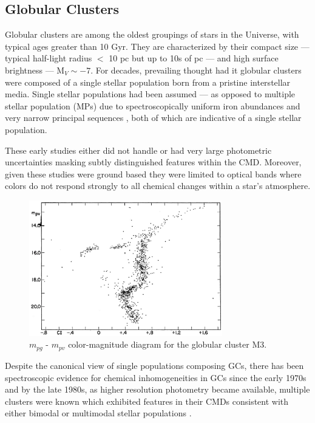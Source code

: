 \subsection{Globular Clusters}
Globular clusters \citep[GC,][]{Herschel1814} are among the oldest groupings of
stars in the Universe, with typical ages greater than 10 Gyr. They are
characterized by their compact size --- typical half-light radius $<$ 10 pc but
up to 10s of pc --- and high surface brightness --- M$_{V} \sim -7$. For
decades, prevailing thought had it globular clusters were composed of a single
stellar population born from a pristine interstellar media. Single stellar
populations had been assumed --- as opposed to multiple stellar population
(MPs) due to spectroscopically uniform iron abundances \citep{Gratton2012} and
very narrow principal sequences \citep{Stetson1988}, both of which are
indicative of a single stellar population.  

These early studies either did not handle or had very large photometric
uncertainties masking subtly distinguished features within the CMD. Moreover,
given these studies were ground based they were limited to optical bands where
colors do not respond strongly to all chemical changes within a star's
atmosphere.

\begin{figure}
	\centering
	\includegraphics[width=0.75\textwidth]{src/Figures/Gould53.png}
	\caption{$m_{pg}$ - $m_{pv}$ color-magnitude diagram for the globular cluster M3.}
	\label{fig:M3CMD}
\end{figure}

Despite the canonical view of single populations composing GCs, there has been
spectroscopic evidence for chemical inhomogeneities in GCs since the early
1970s \citep[e.g.][]{Osborn1971} and by the late 1980s, as higher resolution
photometry became available, multiple clusters were known which exhibited
features in their CMDs consistent with either bimodal or multimodal stellar
populations \citep[e.g.][]{Norris1987}.

